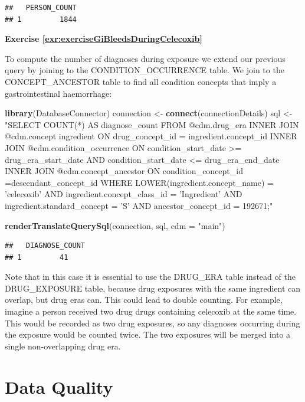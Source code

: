 \documentclass[11pt]{book}
\newenvironment{Shaded}{\begin{snugshade}}{\end{snugshade}}
\newcommand{\DataTypeTok}[1]{\textcolor[rgb]{0.13,0.29,0.53}{#1}}
\newcommand{\KeywordTok}[1]{\textcolor[rgb]{0.13,0.29,0.53}{\textbf{#1}}}
\newcommand{\NormalTok}[1]{#1}
\newcommand{\StringTok}[1]{\textcolor[rgb]{0.31,0.60,0.02}{#1}}
\theoremstyle{definition}
\theoremstyle{definition}
\theoremstyle{definition}
\theoremstyle{remark}
\begin{document}
\begin{verbatim}
##   PERSON_COUNT
## 1         1844
\end{verbatim}

\textbf{Exercise \ref{exr:exerciseGiBleedsDuringCelecoxib}}

To compute the number of diagnoses during exposure we extend our previous query by joining to the CONDITION\_OCCURRENCE table. We join to the CONCEPT\_ANCESTOR table to find all condition concepts that imply a gastrointestinal haemorrhage:

\begin{Shaded}
\begin{Highlighting}[]
\KeywordTok{library}\NormalTok{(DatabaseConnector)}
\NormalTok{connection <-}\StringTok{ }\KeywordTok{connect}\NormalTok{(connectionDetails)}
\NormalTok{sql <-}\StringTok{ "SELECT COUNT(*) AS diagnose_count}
\StringTok{FROM @cdm.drug_era}
\StringTok{INNER JOIN @cdm.concept ingredient}
\StringTok{  ON drug_concept_id = ingredient.concept_id}
\StringTok{INNER JOIN @cdm.condition_occurrence}
\StringTok{  ON condition_start_date >= drug_era_start_date}
\StringTok{    AND condition_start_date <= drug_era_end_date}
\StringTok{INNER JOIN @cdm.concept_ancestor }
\StringTok{  ON condition_concept_id =descendant_concept_id}
\StringTok{WHERE LOWER(ingredient.concept_name) = 'celecoxib'}
\StringTok{  AND ingredient.concept_class_id = 'Ingredient'}
\StringTok{  AND ingredient.standard_concept = 'S'}
\StringTok{  AND ancestor_concept_id = 192671;"}

\KeywordTok{renderTranslateQuerySql}\NormalTok{(connection, sql, }\DataTypeTok{cdm =} \StringTok{"main"}\NormalTok{)}
\end{Highlighting}
\end{Shaded}

\begin{verbatim}
##   DIAGNOSE_COUNT
## 1         41
\end{verbatim}

Note that in this case it is essential to use the DRUG\_ERA table instead of the DRUG\_EXPOSURE table, because drug exposures with the same ingredient can overlap, but drug eras can. This could lead to double counting. For example, imagine a person received two drug drugs containing celecoxib at the same time. This would be recorded as two drug exposures, so any diagnoses occurring during the exposure would be counted twice. The two exposures will be merged into a single non-overlapping drug era.

\hypertarget{DataQualityanswers}{%
\section{Data Quality}\label{DataQualityanswers}}
\end{document}
